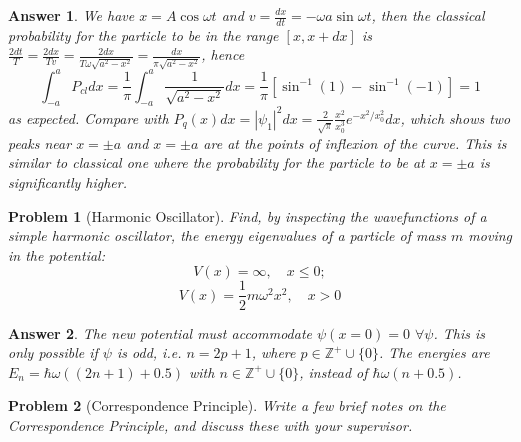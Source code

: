 \documentclass[a4paper]{article}
\newtheorem{ans}{Answer}[section]
\theoremstyle{new}
\newtheorem{qns}{Problem}[section]
\begin{document}
\begin{ans}
We have $x=A\cos\omega t$ and $v=\frac{dx}{dt}=-\omega a\sin\omega t$, then the classical probability for the particle to be in the range $[x,x+dx]$ is $\frac{2dt}{T}=\frac{2dx}{Tv}=\frac{2dx}{T\omega\sqrt{a^2-x^2}}=\frac{dx}{\pi\sqrt{a^2-x^2}}$, hence
$$\int_{-a}^aP_{cl}dx=\frac{1}{\pi}\int_{-a}^a\frac{1}{\sqrt{a^2-x^2}}dx=\frac{1}{\pi}[\sin^{-1}(1)-\sin^{-1}(-1)]=1$$
as expected. Compare with $P_q(x)dx=|\psi_1|^2dx=\frac{2}{\sqrt{\pi}}\frac{x^2}{x_0^3}e^{-x^2/x_0^2}dx$, which shows two peaks near $x=\pm a$ and $x=\pm a$ are at the points of inflexion of the curve. This is similar to classical one where the probability for the particle to be at $x=\pm a $ is significantly higher.
\end{ans}
\begin{qns}[Harmonic Oscillator]
Find, by inspecting the wavefunctions of a simple harmonic oscillator, the energy eigenvalues of a particle of mass $m$ moving in the potential:
$$V(x)=\infty,\quad x\leq 0;$$
$$V(x)=\frac{1}{2}m\omega^2x^2,\quad x>0$$
\end{qns}
\begin{ans}
The new potential must accommodate $\psi(x=0)=0$ $\forall\psi$. This is only possible if $\psi$ is odd, i.e. $n=2p+1$, where $p\in\mathbb{Z}^+\cup\{0\}$. The energies are $E_n=\hbar\omega((2n+1)+0.5)$ with $n\in\mathbb{Z}^+\cup\{0\}$, instead of $\hbar\omega(n+0.5)$.
\end{ans}
\newpage
\begin{qns}[Correspondence Principle]
Write a few brief notes on the Correspondence Principle, and discuss these with your supervisor.
\end{qns}
\end{document}
